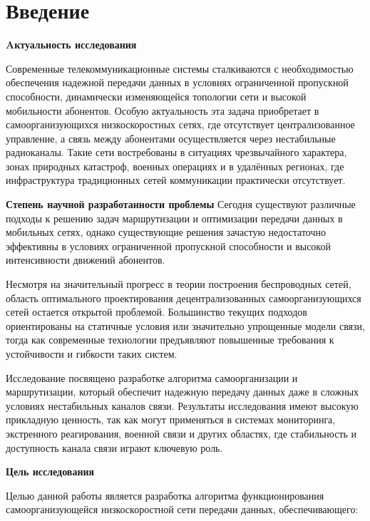 \chapter*{Введение} %

\noindent\textbf{Aктуальность исследования}

Современные телекоммуникационные системы сталкиваются с необходимостью обеспечения надежной передачи данных в условиях ограниченной пропускной способности, динамически изменяющейся топологии сети и высокой мобильности абонентов.
Особую актуальность эта задача приобретает в самоорганизующихся низкоскоростных сетях, где отсутствует централизованное управление, а связь между абонентами осуществляется через нестабильные радиоканалы.
Такие сети востребованы в ситуациях чрезвычайного характера, зонах природных катастроф, военных операциях и в удалённых регионах, где инфраструктура традиционных сетей коммуникации практически отсутствует.

\noindent\textbf{Степень научной разработанности проблемы}
Сегодня существуют различные подходы к решению задач маршрутизации и оптимизации передачи данных в мобильных сетях, однако существующие решения зачастую недостаточно эффективны в условиях ограниченной пропускной способности и высокой интенсивности движений абонентов.

Несмотря на значительный прогресс в теории построения беспроводных сетей, область оптимального проектирования децентрализованных самоорганизующихся сетей остается открытой проблемой. Большинство текущих подходов ориентированы на статичные условия или значительно упрощенные модели связи, тогда как современные технологии предъявляют повышенные требования к устойчивости и гибкости таких систем.

Исследование посвящено разработке алгоритма самоорганизации и маршрутизации, который обеспечит надежную передачу данных даже в сложных условиях нестабильных каналов связи. Результаты исследования имеют высокую прикладную ценность, так как могут применяться в системах мониторинга, экстренного реагирования, военной связи и других областях, где стабильность и доступность канала связи играют ключевую роль.

\noindent\textbf{Цель исследования}

Целью данной работы является разработка алгоритма функционирования самоорганизующейся низкоскоростной сети передачи данных, обеспечивающего:

